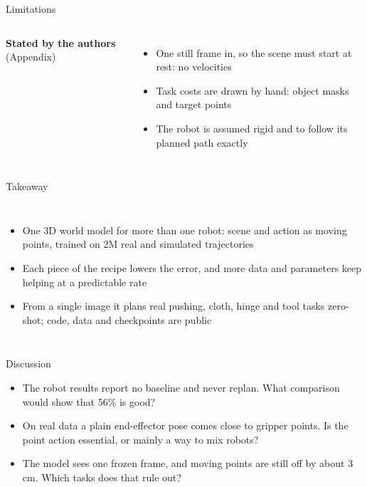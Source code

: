 \documentclass[aspectratio=169,12pt]{beamer}
\newcommand{\pw}[1]{{\color{pw}#1}}
\begin{document}
\begin{frame}{Limitations}
  \vfill
  \begin{columns}
      {\small\bfseries Stated by the authors} {\scriptsize\color{mute}(Appendix)}
      \vspace{4pt}
      \begin{itemize}\setlength{\itemsep}{6pt}
        \item One still frame in, so the scene must start at rest: no velocities
        \item Task costs are drawn by hand: object masks and target points
        \item The robot is assumed rigid and to follow its planned path exactly
      \end{itemize}
  \end{columns}
  \vfill
\end{frame}

\begin{frame}{Takeaway}
  \vfill
  \begin{columns}
      \begin{itemize}\setlength{\itemsep}{10pt}
        \item \pw{One 3D world model for more than one robot: scene and action as moving
          points, trained on 2M real and simulated trajectories}
        \item Each piece of the recipe lowers the error, and more data and parameters keep
          helping at a predictable rate
        \item From a single image it plans real pushing, cloth, hinge and tool tasks
          zero-shot; code, data and checkpoints are public
      \end{itemize}
  \end{columns}
  \vfill
\end{frame}

\begin{frame}{Discussion}
  \begin{itemize}\setlength{\itemsep}{6pt}
    \item The robot results report no baseline and never replan. What comparison would
      show that 56\% is good?
    \item On real data a plain end-effector pose comes close to gripper points. Is the
      point action essential, or mainly a way to mix robots?
    \item The model sees one frozen frame, and moving points are still off by about
      3\,cm. Which tasks does that rule out?
  \end{itemize}
\end{frame}
\end{document}
